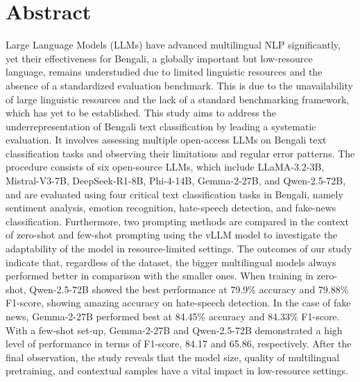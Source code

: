 \documentclass[10pt,letterpaper]{article}
\begin{document}
\section*{Abstract}
Large Language Models (LLMs) have advanced multilingual NLP significantly, yet their effectiveness for Bengali, a globally important but low-resource language, remains understudied due to limited linguistic resources and the absence of a standardized evaluation benchmark. This is due to the unavailability of large linguistic resources and the lack of a standard benchmarking framework, which has yet to be established. This study aims to address the underrepresentation of Bengali text classification by leading a systematic evaluation. It involves assessing multiple open-access LLMs on Bengali text classification tasks and observing their limitations and regular error patterns. The procedure consists of six open-source LLMs, which include LLaMA-3.2-3B, Mistral-V3-7B, DeepSeek-R1-8B, Phi-4-14B, Gemma-2-27B, and Qwen-2.5-72B, and are evaluated using four critical text classification tasks in Bengali, namely sentiment analysis, emotion recognition, hate-speech detection, and fake-news classification. Furthermore, two prompting methods are compared in the context of zero-shot and few-shot prompting using the vLLM model to investigate the adaptability of the model in resource-limited settings. The outcomes of our study indicate that, regardless of the dataset, the bigger multilingual models always performed better in comparison with the smaller ones. When training in zero-shot, Qwen-2.5-72B showed the best performance at 79.9\% accuracy and 79.88\% F1-score, showing amazing accuracy on hate-speech detection. In the case of fake news, Gemma-2-27B performed best at 84.45\% accuracy and 84.33\% F1-score. With a few-shot set-up, Gemma-2-27B and Qwen-2.5-72B demonstrated a high level of performance in terms of F1-score, 84.17 and 65.86, respectively. After the final observation, the study reveals that the model size, quality of multilingual pretraining, and contextual samples have a vital impact in low-resource settings.


\end{document}
